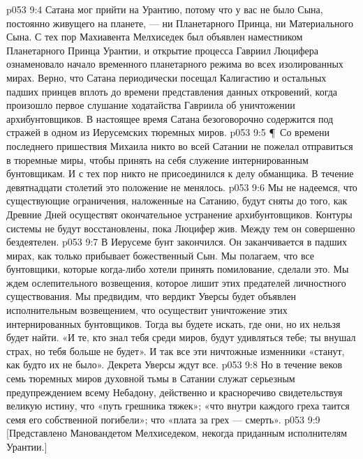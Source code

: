 \vs p053 9:4 Сатана мог прийти на Урантию, потому что у вас не было Сына, постоянно живущего на планете, --- ни Планетарного Принца, ни Материального Сына. С тех пор Махиавента Мелхиседек был объявлен наместником Планетарного Принца Урантии, и открытие процесса Гавриил  Люцифера ознаменовало начало временного планетарного режима во всех изолированных мирах. Верно, что Сатана периодически посещал Калигастию и остальных падших принцев вплоть до времени представления данных откровений, когда произошло первое слушание ходатайства Гавриила об уничтожении архибунтовщиков. В настоящее время Сатана безоговорочно содержится под стражей в одном из Иерусемских тюремных миров.
\vs p053 9:5 \P\ Со времени последнего пришествия Михаила никто во всей Сатании не пожелал отправиться в тюремные миры, чтобы принять на себя служение интернированным бунтовщикам. И с тех пор никто не присоединился к делу обманщика. В течение девятнадцати столетий это положение не менялось.
\vs p053 9:6 Мы не надеемся, что существующие ограничения, наложенные на Сатанию, будут сняты до того, как Древние Дней осуществят окончательное устранение архибунтовщиков. Контуры системы не будут восстановлены, пока Люцифер жив. Между тем он совершенно бездеятелен.
\vs p053 9:7 В Иерусеме бунт закончился. Он заканчивается в падших мирах, как только прибывает божественный Сын. Мы полагаем, что все бунтовщики, которые когда\hyp{}либо хотели принять помилование, сделали это. Мы ждем ослепительного возвещения, которое лишит этих предателей личностного существования. Мы предвидим, что вердикт Уверсы будет объявлен исполнительным возвещением, что осуществит уничтожение этих интернированных бунтовщиков. Тогда вы будете искать, где они, но их нельзя будет найти. «И те, кто знал тебя среди миров, будут удивляться тебе; ты внушал страх, но тебя больше не будет». И так все эти ничтожные изменники «станут, как будто их не было». Декрета Уверсы ждут все.
\vs p053 9:8 Но в течение веков семь тюремных миров духовной тьмы в Сатании служат серьезным предупреждением всему Небадону, действенно и красноречиво свидетельствуя великую истину, что «путь грешника тяжек»; «что внутри каждого греха таится семя его собственной погибели»; что «плата за грех --- смерть».
\vs p053 9:9 [Представлено Мановандетом Мелхиседеком, некогда приданным исполнителям Урантии.]
